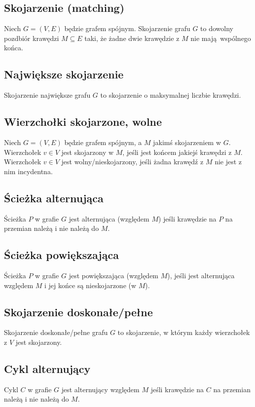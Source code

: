 \subsection*{Skojarzenie (matching)}
Niech $G = (V, E)$ będzie grafem spójnym. Skojarzenie grafu $G$ to dowolny pozdbiór
krawędzi $M \subseteq E$ taki, że żadne dwie krawędzie z $M$ nie mają wspólnego końca.

\subsection*{Największe skojarzenie}
Skojarzenie największe grafu $G$ to skojarzenie o maksymalnej liczbie krawędzi.

\subsection*{Wierzchołki skojarzone, wolne}
Niech $G = (V, E)$ będzie grafem spójnym, a $M$ jakimś skojarzeniem w $G$.
Wierzchołek $v \in V$ jest skojarzony w $M$, jeśli jest końcem jakiejś krawędzi
z $M$. Wierzchołek $v \in V$ jest wolny/nieskojarzony, jeśli żadna krawędź z $M$
nie jest z nim incydentna.

\subsection*{Ścieżka alternująca}
Ścieżka $P$ w grafie $G$ jest alternująca (względem $M$) jeśli krawędzie na $P$
na przemian należą i nie należą do $M$.

\subsection*{Ścieżka powiększająca}
Ścieżka $P$ w grafie $G$ jest powiększająca (względem $M$), jeśli jest 
alternująca względem $M$ i jej końce są nieskojarzone (w $M$).

\subsection*{Skojarzenie doskonałe/pełne}
Skojarzenie doskonałe/pełne grafu $G$ to skojarzenie, w którym każdy
wierzchołek z $V$ jest skojarzony.

\subsection*{Cykl alternujący}
Cykl $C$ w grafie $G$ jest alternujący względem $M$ jeśli krawędzie na $C$
na przemian należą i nie należą do $M$.

